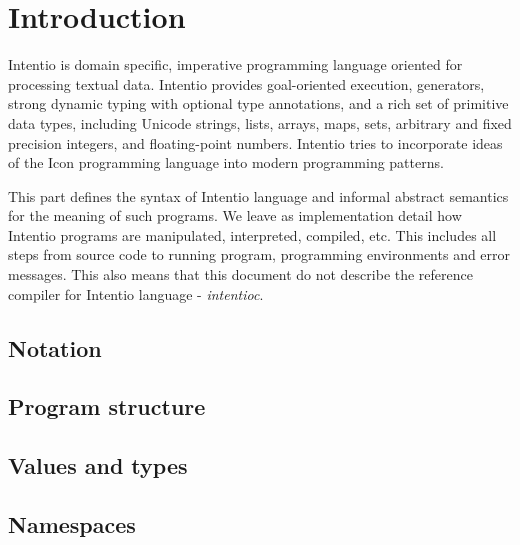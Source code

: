 \chapter{Introduction}

Intentio is domain specific, imperative programming language oriented for processing textual data. Intentio provides goal-oriented execution, generators, strong dynamic typing with optional type annotations, and a rich set of primitive data types, including Unicode strings, lists, arrays, maps, sets, arbitrary and fixed precision integers, and floating-point numbers. Intentio tries to incorporate ideas of the Icon\cite{TheIconProgrammingLanguage} programming language into modern programming patterns.

This part defines the syntax of Intentio language and informal abstract semantics for the meaning of such programs. We leave as implementation detail how Intentio programs are manipulated, interpreted, compiled, etc. This includes all steps from source code to running program, programming environments and error messages. This also means that this document do not describe the reference compiler for Intentio language - \emph{intentioc}\cite{intentioc}.

\section{Notation}


\section{Program structure}


\section{Values and types}


\section{Namespaces}

